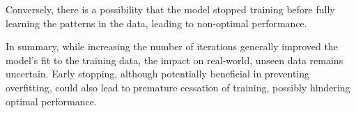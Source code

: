 \documentclass[12pt]{article}
\begin{document}
\begin{enumerate}[leftmargin=\labelsep]
          Conversely, there is a possibility that the model stopped training before fully learning the patterns in the data, leading to non-optimal performance.

          In summary, while increasing the number of iterations generally improved the model's fit to the training data, the impact on real-world, unseen data remains uncertain.
          Early stopping, although potentially beneficial in preventing overfitting, could also lead to premature cessation of training, possibly hindering optimal performance.
\end{enumerate}
\end{document}
